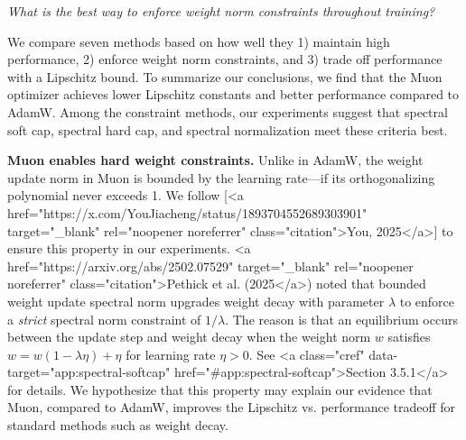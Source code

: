 \begin{center}
    \textit{What is the best way to enforce weight norm constraints throughout training?}
\end{center}

We compare seven methods based on how well they 1) maintain high performance, 2) enforce weight norm constraints, and 3) trade off performance with a Lipschitz bound. To summarize our conclusions, we find that the Muon optimizer achieves lower Lipschitz constants and better performance compared to AdamW. Among the constraint methods, our experiments suggest that spectral soft cap, spectral hard cap, and spectral normalization meet these criteria best.

\textbf{Muon enables hard weight constraints.} Unlike in AdamW, the weight update norm in Muon is bounded by the learning rate---if its orthogonalizing polynomial never exceeds 1. We follow [<a href="https://x.com/YouJiacheng/status/1893704552689303901" target="_blank" rel="noopener noreferrer" class="citation">You, 2025</a>] to ensure this property in our experiments. <a href="https://arxiv.org/abs/2502.07529" target="_blank" rel="noopener noreferrer" class="citation">Pethick et al. (2025</a>) noted that bounded weight update spectral norm upgrades weight decay with parameter $\lambda$ to enforce a \textit{strict} spectral norm constraint of $1/\lambda$. The reason is that an equilibrium occurs between the update step and weight decay when the weight norm $w$ satisfies $w = w(1 - \lambda \eta) + \eta$ for learning rate $\eta > 0$. See <a class="cref" data-target="app:spectral-softcap" href="#app:spectral-softcap">Section 3.5.1</a> for details. We hypothesize that this property may explain our evidence that Muon, compared to AdamW, improves the Lipschitz vs. performance tradeoff for standard methods such as weight decay.

